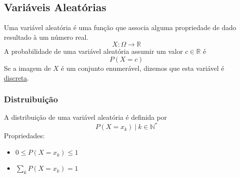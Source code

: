 \documentclass{article}
\begin{document}
\subsection{Variáveis Aleatórias}
Uma variável aleatória é uma função que associa alguma propriedade de dado resultado à um número real.
\[ X: \Omega \to \mathbb{R} \]
A probabilidade de uma variável aleatória assumir um valor $c \in \mathbb{R}$ é
\[ P(X = c) \]
Se a imagem de $X$ é um conjunto enumerável, dizemos que esta variável é \uline{discreta}. \\[5pt]

\subsubsection{Distruibuição}
A distribuição de uma variável aleatória é definida por
\[ P(X = x_k) \:\big|\: k \in \mathbb{N}^* \]
Propriedades:
\begin{itemize}
  \item $0 \leq P(X = x_k) \leq 1$
  \item $\sum\limits_k P(X = x_k) = 1$
\end{itemize}
\end{document}
